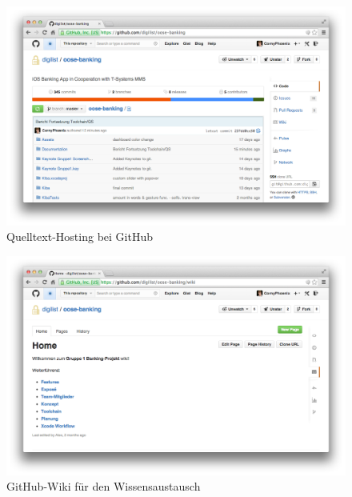 \begin{figure}
	\centering
	\includegraphics[scale=.25]{Pictures/GitHubOverview}
	\caption{Quelltext-Hosting bei GitHub \label{fig:GitHubOverview}}
\end{figure}

\begin{figure}
	\centering
	\includegraphics[scale=.25]{Pictures/GitHubWiki}
	\caption{GitHub-Wiki für den Wissensaustausch \label{fig:GitHubWiki}}
\end{figure}

